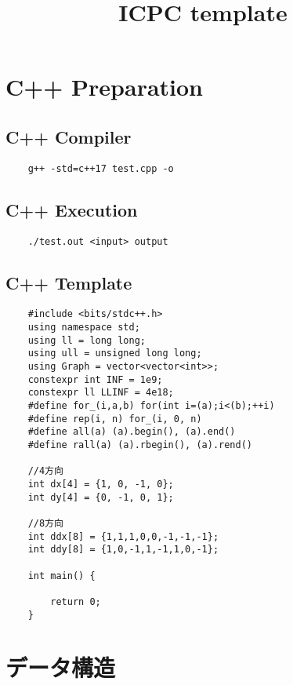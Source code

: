 \documentclass[a4paper, landscape, 9pt]{jarticle} %
\title{\vspace{-4ex}\huge{ICPC template}} %
\author{} %
\date{} %
\begin{document}
\begin{multicols*}{3} %
    \maketitle
    \vspace{-25mm}
    \tableofcontents

    \newpage

    \section{C++ Preparation}
    \subsection{C++ Compiler}
    \begin{lstlisting}
    g++ -std=c++17 test.cpp -o
    \end{lstlisting}

    \subsection{C++ Execution}
    \begin{lstlisting}
    ./test.out <input> output
    \end{lstlisting}

    \subsection{C++ Template}
    \begin{lstlisting}
    #include <bits/stdc++.h>
    using namespace std;
    using ll = long long;
    using ull = unsigned long long;
    using Graph = vector<vector<int>>;
    constexpr int INF = 1e9;
    constexpr ll LLINF = 4e18;
    #define for_(i,a,b) for(int i=(a);i<(b);++i)
    #define rep(i, n) for_(i, 0, n)
    #define all(a) (a).begin(), (a).end()
    #define rall(a) (a).rbegin(), (a).rend()

    //4方向
    int dx[4] = {1, 0, -1, 0};
    int dy[4] = {0, -1, 0, 1};

    //8方向
    int ddx[8] = {1,1,1,0,0,-1,-1,-1}; 
    int ddy[8] = {1,0,-1,1,-1,1,0,-1};

    int main() {
        
        return 0;
    }
    \end{lstlisting}

    \section{データ構造}

\end{multicols*}
\end{document}
